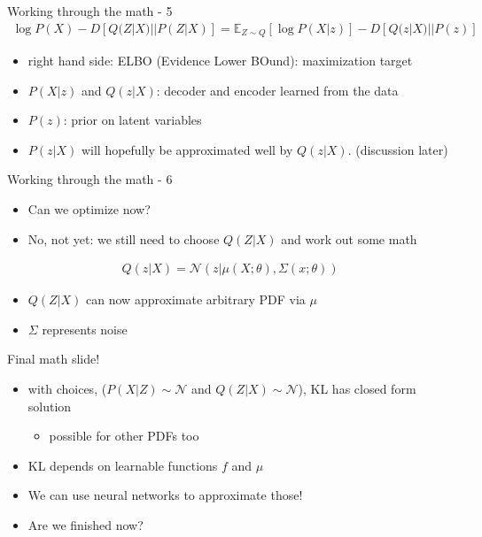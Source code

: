 \documentclass[10pt]{beamer}
\begin{document}
\begin{frame}{Working through the math - 5}
    \begin{gather}
        \log P(X) - D[Q(Z|X)||P(Z|X)] = \mathbb{E}_{Z\sim Q}[\log P(X|z)] - D[Q(z|X)||P(z)]
    \end{gather}
    
    \begin{itemize}[<+->]
        \item right hand side: ELBO (Evidence Lower BOund): maximization target
        \item $P(X|z)$ and $Q(z|X)$: decoder and encoder learned from the data
        \item $P(z)$: prior on latent variables
        \item $P(z|X)$ will hopefully be approximated well by $Q(z|X)$. (discussion later)
    \end{itemize}
\end{frame}
\begin{frame}{Working through the math - 6}
    \begin{itemize}[<+->]
        \item Can we optimize now?
        \item No, not yet: we still need to choose $Q(Z|X)$ and work out some math
    \end{itemize}
    \pause
    \begin{gather}
        Q(z|X) = \mathcal{N}(z|\mu(X;\theta),\Sigma(x;\theta))
    \end{gather}

    \begin{itemize}[<+->]
        \item $Q(Z|X)$ can now approximate arbitrary PDF via $\mu$
        \item $\Sigma$ represents noise
    \end{itemize}
\end{frame}

\begin{frame}{Final math slide!}
    \begin{itemize}[<+->]
        \item with choices, ($P(X|Z)\sim\mathcal{N}$ and $Q(Z|X)\sim\mathcal{N}$), KL has closed form solution
            \begin{itemize}
                \item possible for other PDFs too
            \end{itemize}
        \item KL depends on learnable functions $f$ and $\mu$
        \item We can use neural networks to approximate those!
        \item Are we finished now?
    \end{itemize}
\end{frame}
\end{document}
